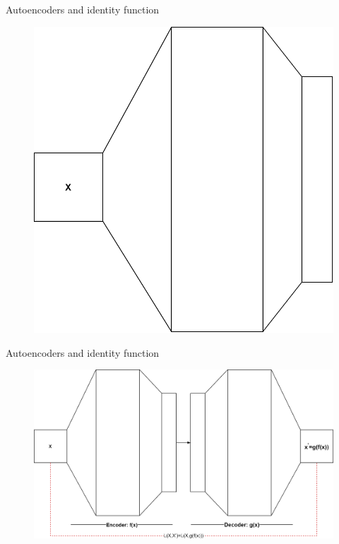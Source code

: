 \begin{frame}{Autoencoders and identity function} 
	\begin{center}
		\begin{figure}
			\includegraphics[width=.5\textwidth]{figures/autoencoder_2}
		\end{figure}
	\end{center}
\end{frame}
\begin{frame}{Autoencoders and identity function} 
	\begin{center}
		\begin{figure}
			\includegraphics[width=.9\textwidth]{figures/autoencoder_3}
		\end{figure}
	\end{center}
\end{frame}



